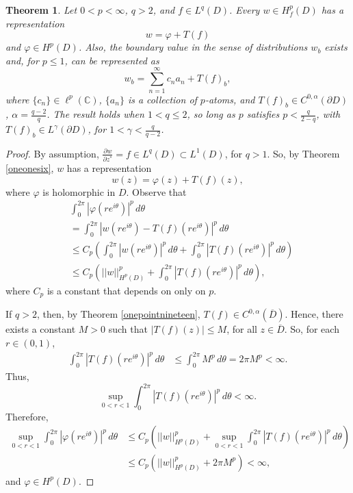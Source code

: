 \documentclass[suppldata]{interact}
\theoremstyle{plain}%
\newtheorem{theorem}{Theorem}[section]
\theoremstyle{definition}
\theoremstyle{remark}
\newcommand{\p}{\partial}
\begin{document}
\begin{theorem}\label{thm: 2.10WBextension}
Let $0 < p < \infty$, $q > 2$, and $f \in L^q(D)$. Every $w \in H^p_f(D)$ has a representation 
\[
    w = \varphi + T(f)
\]
and $\varphi \in H^p(D)$. Also, the boundary value in the sense of distributions $w_b$ exists and, for $p\leq 1$, can be represented as 
\[
    w_b = \sum_{n=1}^\infty c_n a_n + T(f)_b,
\]
where $\{c_n\} \in \ell^p(\mathbb{C})$, $\{a_n\}$ is a collection of $p$-atoms, and $T(f)_b \in C^{0,\alpha}(\p D)$, $\alpha = \frac{q-2}{q}$. The result holds when $1 < q \leq 2$, so long as $p$ satisfies $p < \frac{q}{2-q}$, with $T(f)_b \in L^\gamma(\p D)$, for $1 < \gamma< \frac{q}{q-2}$.
\end{theorem}

\begin{proof}
    By assumption, $\frac{\p w}{\p z^*} = f \in L^q(D) \subset L^1(D)$, for $q > 1$. So, by Theorem \ref{oneonesix}, $w$ has a representation 
\begin{equation}\label{repofsecondkind}
w(z) = \varphi(z) + T(f)(z),
\end{equation}
where $\varphi$ is holomorphic in $D$. Observe that
\begin{align*}
&\int_0^{2\pi} |\varphi(re^{i\theta})|^p \,d\theta  \\
&= \int_0^{2\pi} |w(re^{i\theta}) - T(f)(re^{i\theta})|^p \,d\theta  \\
&\leq C_p \left(\int_0^{2\pi} |w(re^{i\theta})|^p \,d\theta + \int_0^{2\pi} | T(f)(re^{i\theta})|^p \,d\theta\right)\\
&\leq C_p\left(||w||^p_{H^p(D)} + \int_0^{2\pi} | T(f)(re^{i\theta})|^p \,d\theta \right),
\end{align*}
where $C_p$ is a constant that depends on only on $p$.

If $q>2$, then, by Theorem \ref{onepointnineteen}, $T(f) \in C^{0, \alpha}(\overline{D})$. Hence, there exists a constant $M>0$ such that $|T(f)(z)| \leq M$, for all $z \in \overline{D}$. So, for each $r \in (0,1)$,
\begin{align*}
    \int_0^{2\pi} | T(f)(re^{i\theta})|^p \,d\theta &\leq \int_0^{2\pi} M^p \,d\theta = 2\pi M^p  < \infty.
\end{align*}
Thus, 
\[
\sup_{0 < r < 1} \int_0^{2\pi} | T(f)(re^{i\theta})|^p \,d\theta < \infty.
\]
Therefore, 
\begin{align*}
\sup_{0 < r < 1} \int_0^{2\pi} |\varphi(re^{i\theta})|^p \,d\theta &\leq C_p\left(||w||^p_{H^p(D)} + \sup_{0 < r < 1}\int_0^{2\pi} | T(f)(re^{i\theta})|^p \,d\theta \right) \\
&\leq C_p\left(||w||^p_{H^p(D)} + 2\pi M^p \right) < \infty,
\end{align*}
and $\varphi \in H^p(D)$. 


\end{proof}
\end{document}
